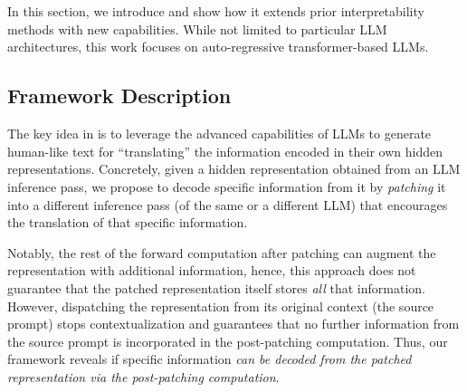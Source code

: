 \documentclass{article}
\theoremstyle{plain}
\theoremstyle{definition}
\theoremstyle{remark}
\begin{document}
\section{\methodFamilyName{}}
\label{sec:method}

In this section, we introduce \methodFamilyName{} and show how it extends prior interpretability methods with new capabilities. While not limited to particular LLM architectures, this work focuses on auto-regressive transformer-based LLMs.

\subsection{Framework Description}
\label{sec:framework}

The key idea in \methodFamilyName{} is to leverage the advanced capabilities of LLMs to generate human-like text for ``translating'' the information encoded in their own hidden representations. Concretely, given a hidden representation obtained from an LLM inference pass, we propose to decode specific information from it by \textit{patching} it into a different inference pass (of the same or a different LLM) that encourages the translation of that specific information.

Notably, the rest of the forward computation after patching can augment the representation with additional information, hence, this approach does not guarantee that the patched representation itself stores \textit{all} that information. However, dispatching the representation from its original context (the source prompt) stops contextualization and guarantees that no further information from the source prompt is incorporated in the post-patching computation. Thus, our framework reveals if specific information \textit{can be decoded from the patched representation via the post-patching computation}.
\end{document}
